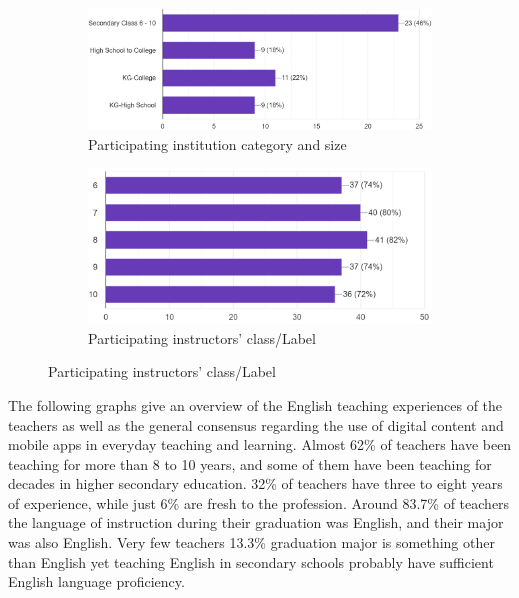 \documentclass[sn-mathphys,Numbered]{sn-jnl}%
\theoremstyle{thmstyleone}%
\theoremstyle{thmstyletwo}%
\theoremstyle{thmstylethree}%
\begin{document}
\begin{figure}[h!]
\centering
\begin{subfigure}{0.48\textwidth}
    \includegraphics[width=\textwidth]{institution_size.png}
    \caption{Participating institution category and size}
    \label{cv}
\end{subfigure}
\hfill
\begin{subfigure}{0.48\textwidth}
    \includegraphics[width=\textwidth]{english_teaching_class.png}
    \caption{Participating instructors' class/Label}
    \label{umass}
\end{subfigure}       
\label{cv_umass}
\end{figure}

The following graphs give an overview of the English teaching experiences of the teachers as well as the general consensus regarding the use of digital content and mobile apps in everyday teaching and learning. Almost 62\% of teachers have been teaching for more than 8 to 10 years, and some of them have been teaching for decades in higher secondary education. 32\% of teachers have three to eight years of experience, while just 6\% are fresh to the profession. Around 83.7\% of teachers the language of instruction during their graduation was English, and their major was also English. Very few teachers 13.3\% graduation major is something other than English yet teaching English in secondary schools probably have sufficient English language proficiency.  
\end{document}
